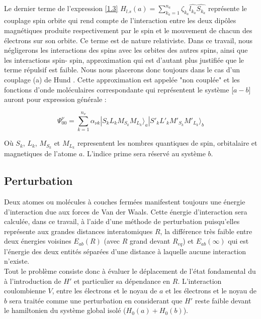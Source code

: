 	Le dernier terme de l'expression \ref{1.3} $H_{l.s}(a) = \sum_{k_{a}=1}^{n_{a}} \zeta_{k_{a}} \widehat{l_{k_{a}}} \widehat{S_{k_{a}}}$ représente le couplage spin orbite qui rend compte de l'interaction entre les deux dipôles magnétiques produite respectivement par le spin et le mouvement de chacun des électrons sur son orbite. Ce terme est de nature relativiste. Dans ce travail, nous négligerons les interactions des spins avec les orbites des autres spins, ainsi que les interactions spin- spin, approximation qui est d'autant plus justifiée que le terme répulsif est faible. Nous nous placerons donc toujours dans le cas d'un couplage (a) de Hund \cite{bussery1989semi}. Cette approximation est appelée "non couplée" \cite{fontana1961theory,fontana1962theory} et les fonctions d'onde moléculaires correspondante qui représentent le système [$a-b$] auront pour expression générale : 
	
	\begin{equation}
	\Psi_{00}^{\nu} = \sum_{k=1}^{n_{\nu}} \alpha_{\nu k}| S_{k} L_{k} M_{S_{k}} M_{L_{k}} \rangle _{a} | S'_{k} L'_{k} M'_{S_{k}} M'_{L_{k}} \rangle _{b}
	\end{equation}
	
	Où $S_{k}$, $L_{k}$, $M_{S_{k}}$ et $M_{L_{k}}$ representent les nombres quantiques de spin, orbitalaire et magnetiques de l'atome $a$. L'indice prime sera réservé au système $b$. 
	
	
	\subsection{Perturbation}
	
	Deux atomes ou molécules à couches fermées manifestent toujours une énergie d'interaction due aux forces de Van der Waals. Cette énergie d'interaction sera calculée, dans ce travail, à l'aide d'une méthode de perturbation puisqu'elles représente aux grandes distances interatomiques $R$, la différence très faible entre deux énergies voisines $E_{ab}(R)$ (avec $R$ grand devant $R_{eq}$) et $E_{ab}(\infty)$ qui est l'énergie des deux entités séparées d'une distance à laquelle aucune interaction n'existe.\\
	
	Tout le problème consiste donc à évaluer le déplacement de l'état fondamental du à l'introduction de $H'$ et particulier sa dépendance en $R$. L'interaction coulombienne $V$, entre les électrons et le noyau de $a$ et les électrons et le noyau de $b$ sera traitée comme une perturbation en considerant que $H'$ reste faible devant le hamiltonien du système global isolé ($H_{0}(a)+ H_{0}(b)$). 
	
